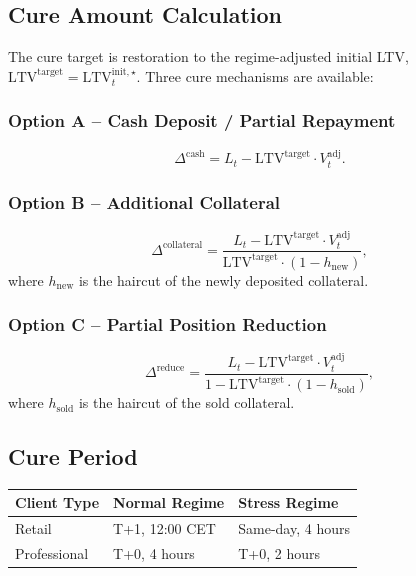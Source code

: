 \documentclass[12pt, a4paper]{article}
\newcommand{\LTV}{\mathrm{LTV}}
\newcommand{\1}{\mathbbm{1}}
\begin{document}
\subsection{Cure Amount Calculation}

The cure target is restoration to the regime-adjusted initial LTV,
$\LTV^{\mathrm{target}} = \LTV^{\mathrm{init},\star}_t$. Three cure mechanisms
are available:

\subsubsection*{Option A -- Cash Deposit / Partial Repayment}
\[
\Delta^{\mathrm{cash}} = L_t - \LTV^{\mathrm{target}}\cdot V_t^{\mathrm{adj}}.
\]

\subsubsection*{Option B -- Additional Collateral}
\[
\Delta^{\mathrm{collateral}}
= \frac{L_t - \LTV^{\mathrm{target}}\cdot V_t^{\mathrm{adj}}}
       {\LTV^{\mathrm{target}}\cdot(1 - h_{\mathrm{new}})},
\]
where $h_{\mathrm{new}}$ is the haircut of the newly deposited collateral.

\subsubsection*{Option C -- Partial Position Reduction}
\[
\Delta^{\mathrm{reduce}}
= \frac{L_t - \LTV^{\mathrm{target}}\cdot V_t^{\mathrm{adj}}}
       {1 - \LTV^{\mathrm{target}}\cdot(1 - h_{\mathrm{sold}})},
\]
where $h_{\mathrm{sold}}$ is the haircut of the sold collateral.

\subsection{Cure Period}
\begin{table}[H]
\centering
\begin{tabular}{lll}
\toprule
\textbf{Client Type} & \textbf{Normal Regime} & \textbf{Stress Regime} \\
\midrule
Retail       & T+1, 12:00 CET & Same-day, 4 hours \\
Professional & T+0, 4 hours   & T+0, 2 hours \\
\bottomrule
\end{tabular}
\end{table}

\end{document}
